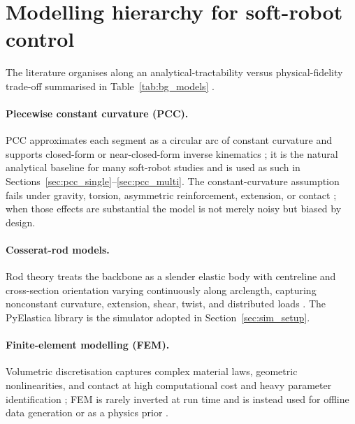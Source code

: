 \section{Modelling hierarchy for soft-robot control}
\label{sec:bg_models_hierarchy}

The literature organises along an analytical-tractability versus physical-fidelity trade-off summarised in Table~\ref{tab:bg_models} \cite{webster2010review, rucker2011statics, gazzola2018pyelastica, mengaldo2022embodied, armanini2023structured}.

\paragraph{Piecewise constant curvature (PCC).}
\label{sec:bg_models_pcc}
PCC approximates each segment as a circular arc of constant curvature and supports closed-form or near-closed-form inverse kinematics \cite{webster2010review}; it is the natural analytical baseline for many soft-robot studies and is used as such in Sections~\ref{sec:pcc_single}--\ref{sec:pcc_multi}. The constant-curvature assumption fails under gravity, torsion, asymmetric reinforcement, extension, or contact \cite{webster2010review, mengaldo2022embodied, armanini2023structured}; when those effects are substantial the model is not merely noisy but biased by design.

\paragraph{Cosserat-rod models.}
\label{sec:bg_models_cosserat}
Rod theory treats the backbone as a slender elastic body with centreline and cross-section orientation varying continuously along arclength, capturing nonconstant curvature, extension, shear, twist, and distributed loads \cite{rucker2011statics, gazzola2018pyelastica, mengaldo2022embodied, armanini2023structured}. The PyElastica library \cite{gazzola2018pyelastica} is the simulator adopted in Section~\ref{sec:sim_setup}.

\paragraph{Finite-element modelling (FEM).}
Volumetric discretisation captures complex material laws, geometric nonlinearities, and contact at high computational cost and heavy parameter identification \cite{mengaldo2022embodied, armanini2023structured}; FEM is rarely inverted at run time and is instead used for offline data generation or as a physics prior \cite{gao2024residual, park2025dualae}.

